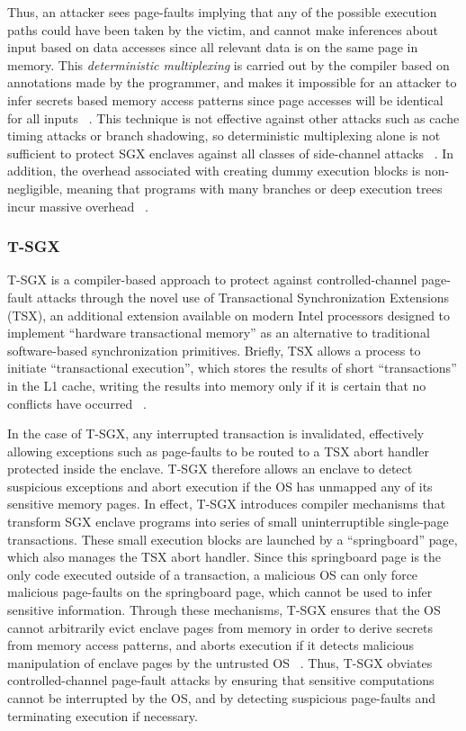 Thus, an attacker sees page-faults implying that any of the possible execution paths could have been taken by the victim, and cannot make inferences about input based on data accesses since all relevant data is on the same page in memory. This \emph{deterministic multiplexing} is carried out by the compiler based on annotations made by the programmer, and makes it impossible for an attacker to infer secrets based memory access patterns since page accesses will be identical for all inputs ~\cite{shinde_preventing_2015}. This technique is not effective against other attacks such as cache timing attacks or branch shadowing, so deterministic multiplexing alone is not sufficient to protect SGX enclaves against all classes of side-channel attacks ~\cite{shinde_preventing_2015, lee_inferring_2017}. In addition, the overhead associated with creating dummy execution blocks is non-negligible, meaning that programs with many branches or deep execution trees incur massive overhead ~\cite{shinde_preventing_2015}.

\subsubsection{T-SGX}

T-SGX is a compiler-based approach to protect against controlled-channel page-fault attacks through the novel use of Transactional Synchronization Extensions (TSX), an additional extension available on modern Intel processors designed to implement ``hardware transactional memory'' as an alternative to traditional software-based synchronization primitives. Briefly, TSX allows a process to initiate ``transactional execution'', which stores the results of short ``transactions'' in the L1 cache, writing the results into memory only if it is certain that no conflicts have occurred ~\cite{shih_t-sgx:_2017}. 

In the case of T-SGX, any interrupted transaction is invalidated, effectively allowing exceptions such as page-faults to be routed to a TSX abort handler protected inside the enclave. T-SGX therefore allows an enclave to detect suspicious exceptions and abort execution if the OS has unmapped any of its sensitive memory pages. In effect, T-SGX introduces compiler mechanisms that transform SGX enclave programs into series of small uninterruptible single-page transactions. These small execution blocks are launched by a ``springboard'' page, which also manages the TSX abort handler. Since this springboard page is the only code executed outside of a transaction, a malicious OS can only force malicious page-faults on the springboard page, which cannot be used to infer sensitive information. Through these mechanisms, T-SGX ensures that the OS cannot arbitrarily evict enclave pages from memory in order to derive secrets from memory access patterns, and aborts execution if it detects malicious manipulation of enclave pages by the untrusted OS ~\cite{shih_t-sgx:_2017}. Thus, T-SGX obviates controlled-channel page-fault attacks by ensuring that sensitive computations cannot be interrupted by the OS, and by detecting suspicious page-faults and terminating execution if necessary. 

